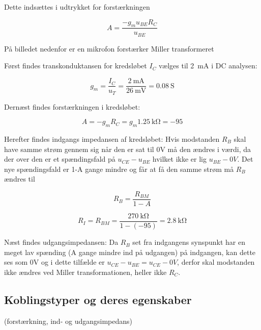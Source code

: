 \documentclass[danish]{article}
\begin{document}
Dette indsættes i udtrykket for forstærkningen

\begin{equation} 
A = \dfrac{-g_m u_{BE}R_C}{u_{BE}}
\end{equation}

På billedet nedenfor er en mikrofon forstærker Miller transformeret

Først findes transkonduktansen for kredsløbet $I_C$ vælges til \SI{2}{\milli\ampere} i DC analysen:

\begin{equation} 
g_m = \dfrac{I_C}{u_T} = \dfrac{\SI{2}{\milli\ampere}}{\SI{26}{\milli\volt}} = \SI{0.08}{\siemens}
\end{equation}

Dernæst findes forstærkningen i kredsløbet:

\begin{equation} 
A = -g_m R_C = g_m \SI{1.25}{\kilo\ohm} = -95
\end{equation}

Herefter findes indgangs impedansen af kredsløbet:
Hvis modstanden $R_B$ skal have samme strøm gennem sig når den er sat til 0V må den ændres i værdi, da der over den er et spændingsfald på
$u_{CE}-u_{BE}$ hvilket ikke er lig $u_{BE}-0V$. Det nye spændingsfald er 1-A gange mindre og får at få den samme strøm må $R_B$ ændres til

\begin{equation} 
R_B = \dfrac{R_{BM}}{1-A}
\end{equation}

\begin{equation} 
R_I = R_{BM} = \dfrac{\SI{270}{\kilo\ohm}}{1-(-95)} = \SI{2.8}{\kilo\ohm}
\end{equation}

Næst findes udgangsimpedansen:
Da $R_B$ set fra indgangens synspunkt har en meget lav spænding (A gange mindre ind på udgangen) på indgangen, kan dette ses som 0V og i dette tilfælde er $u_{CE}-u_{BE} = u_{CE}-0V$, derfor skal modstanden ikke ændres ved Miller transformationen, heller ikke $R_C$. 

\subsection{Koblingstyper og deres egenskaber}
(forstærkning, ind- og udgangsimpedans)
\end{document}
